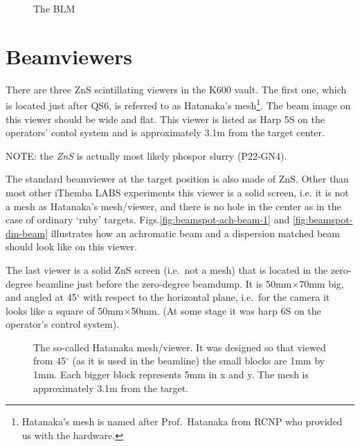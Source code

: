 \documentclass[11pt]{report}
\begin{document}
\begin{figure}[!ht]
\centerline{\vspace{0cm}\hspace{0cm}
}
\centering
\caption{The BLM}
\label{fig:hatanaka}
\end{figure} 


\section{Beamviewers}
There are three ZnS scintillating viewers in the K600 vault. The first one, which is located just after QS6, is referred to as Hatanaka's mesh\footnote{Hatanaka's mesh is named after Prof.~Hatanaka from RCNP who provided us with the hardware.}. The beam image on this viewer should be wide and flat.
This viewer is listed as Harp 5S on the operators' contol system and is approximately 3.1m from the target center.

NOTE: the {\it ZnS} is actually most likely phospor slurry (P22-GN4).

The standard beamviewer at the target position is also made of ZnS. Other than most
other iThemba LABS experiments this viewer is a solid screen, i.e. it is not a mesh as Hatanaka's mesh/viewer, and there is no hole in the center as in the case of ordinary `ruby' targets.  Figs.\ref{fig:beamspot-ach-beam-1} and \ref{fig:beamspot-dm-beam} illustrates how an achromatic beam and a dispersion matched beam should look like on this viewer.

The last viewer is a solid ZnS screen (i.e.~not a mesh) that is located in the 
zero-degree beamline just before the zero-degree beamdump. 
It is 50mm$\times$70mm big, and angled at 45$^{\circ}$ with respect to the horizontal plane, i.e.~for the camera it looks like
a square of 50mm$\times$50mm.
(At some stage it was harp 6S on the operator's control system).

\bigskip
{}


\begin{figure}[!ht]
\centerline{\vspace{0cm}\hspace{0cm}
}
\centering
\caption{The so-called Hatanaka mesh/viewer. It was designed so that viewed from 45$^{\circ}$
(as it is used in the beamline) the small blocks are 1mm by 1mm. 
Each bigger block represents 5mm in x and y. The mesh is approximately 3.1m from the target.}
\label{fig:hatanaka-1}
\end{figure} 
\end{document}
